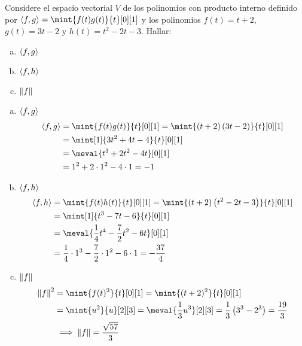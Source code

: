 \begin{exercise}
	Considere el espacio vectorial $V$ de los polinomios con producto interno definido por $\inprod{f, g} =\mint{f(t)g(t)}{t}[0][1]$ y los polinomios $f(t) = t + 2$, $g(t) = 3t - 2$ y $h(t) = t^{2} - 2t - 3$. Hallar:
	\begin{enumerate}[a)]
		\item $\left\langle f, g \right\rangle$
		\item $\left\langle f, h \right\rangle$
		\item $\left\Vert f \right\Vert$
	\end{enumerate}
\end{exercise}
\begin{solution}
	\begin{enumerate}[a)]
		\item $\left\langle f, g \right\rangle$
		\begin{align*}
			\inprod{f, g} &=\mint{f(t)g(t)}{t}[0][1] =\mint{\pa{t + 2}\pa{3t - 2}}{t}[0][1]\\
			&=\mint[1]{3t^{2} + 4t - 4}{t}[0][1]\\
			&=\meval{t^{3} + 2t^{2} - 4t}[0][1]\\
			&= 1^{2} + 2\cdot 1^{2} - 4\cdot 1 = -1
		\end{align*}
		\item $\left\langle f, h \right\rangle$
		\begin{align*}
			\inprod{f, h} &=\mint{f(t)h(t)}{t}[0][1] =\mint{\pa{t + 2}\pa{t^{2} - 2t - 3}}{t}[0][1]\\
			&=\mint[1]{t^{3} - 7t - 6}{t}[0][1]\\
			&=\meval{\dfrac{1}{4}t^{4} -\dfrac{7}{2}t^{2} - 6t}[0][1]\\
			&=\dfrac{1}{4}\cdot 1^{3} - \dfrac{7}{2}\cdot 1^{2} - 6\cdot 1 = -\dfrac{37}{4}
		\end{align*}
		\item $\left\Vert f \right\Vert$
		\begin{align*}
			\norm{f}^{2} &=\mint{f(t)^{2}}{t}[0][1] =\mint{(t + 2)^{2}}{t}[0][1]\\
			&=\mint{u^{2}}{u}[2][3] =\meval{\dfrac{1}{3}u^{3}}[2][3] =\dfrac{1}{3}\pa{3^{3} - 2^{3}} =\dfrac{19}{3}\\
			&\implies\norm{f} =\dfrac{\sqrt{57}}{3}
		\end{align*}
	\end{enumerate}
\end{solution}